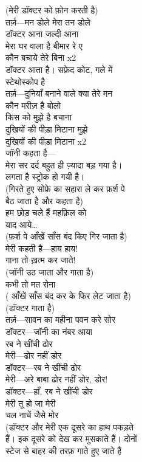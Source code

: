 {{{{{{{{{{{{{{{{{{(मेरी डॉक्टर को फ़ोन करती है)\\
तर्ज़—मन डोले मेरा तन डोले\\
डॉक्टर आना जल्दी आना\\
मेरा घर वाला है बीमार रे ए\\
कौन बचाये तेरे बिना x2\\
डॉक्टर आता है। सफ़ेद कोट, गले में\\
स्टेथोस्कोप है\\
तर्ज़—दुनियाँ बनाने वाले क्या तेरे मन\\
कौन मरीज़ है बोलो\\
किस को मुझे है बचाना\\
दुखियों की पीड़ा मिटाना मुझे\\
दुखियों की पीड़ा मिटाना x2\\
जॉनी कहता है—\\
मेरा सर दर्द बहुत ही ज़्यादा बड़ गया है।\\
लगता है स्ट्रोक हो गयी है।\\
(गिरते हुए सोफ़े का सहारा ले कर फ़र्श पे\\
बैठ जाता है और कहता है)\\
हम छोड़ चले हैं महफ़िल को\\
याद आये…\\
(फ़र्श पे आँखें साँस बंद किए गिर जाता है)\\
मेरी कहती है—हाय हाय!\\
गाना तो ख़त्म कर जाते!\\
(जॉनी उठ जाता और गाता है)\\
कभी तो मत रोना\\
( आँखें साँस बंद कर के फिर लेट जाता है)\\
(डॉक्टर गाता है)\\
तर्ज़—सावन का महीना पवन करे सोर\\
डॉक्टर—जॉनी का नंबर आया\\
रब ने खींची ढोर\\
मेरी—ढोर नहीं डोर\\
डॉक्टर—रब ने खींची ढोर\\
मेरी—अरे बाबा ढोर नहीं डोर, डोर!\\
डॉक्टर—हाँ, रब ने खींची डोर\\
मेरी तू हो जा मेरी\\
चल नाचें जैसे मोर\\
(डॉक्टर और मेरी एक दूसरे का हाथ पकड़ते\\
हैं। इक दूसरे को देख कर मुसकाते हैं। दोनों\\
स्टेज से बाहर की तरफ़ गाते हुए जाते हैं\\
}}}}}}}}}}}}}}}}}}
